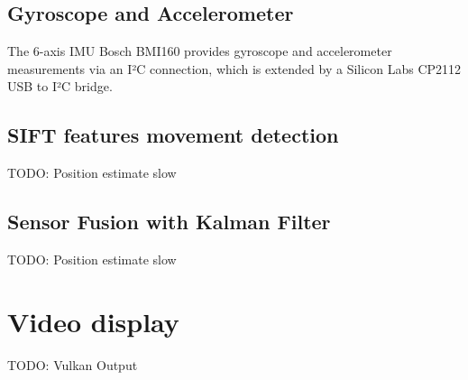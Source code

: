 \subsection{Gyroscope and Accelerometer}
\label{sec:GyroPosition}
The 6-axis IMU Bosch BMI160 provides gyroscope and accelerometer measurements via an I²C connection, which is extended by a Silicon Labs CP2112 USB to I²C bridge. 
\subsection{SIFT features movement detection}
\label{sec:SIFTPosition}
TODO: Position estimate slow
\subsection{Sensor Fusion with Kalman Filter}
\label{sec:SensorFusion}
TODO: Position estimate slow
\section{Video display}
\label{sec:VideoDisplay}
TODO: Vulkan Output